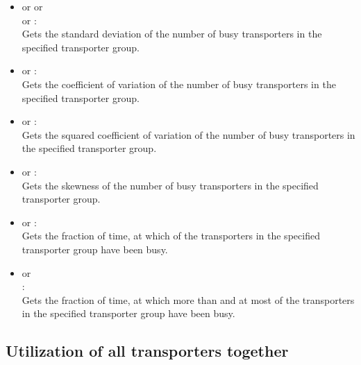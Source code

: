 \begin{itemize}
\item
{} or  or\\
 or :\\
Gets the standard deviation of the number of busy transporters in the specified transporter group.
  
\item
{} or :\\
Gets the coefficient of variation of the number of busy transporters in the specified transporter group.
  
\item
{} or :\\
Gets the squared coefficient of variation of the number of busy transporters in the specified transporter group.

\item
{} or :\\
Gets the skewness of the number of busy transporters in the specified transporter group.

\item
{} or :\\
Gets the fraction of time, at which  of the transporters in the specified transporter group have been busy.
  
\item
{} or\\
:\\
Gets the fraction of time, at which more than  and at most  of the transporters in the specified transporter group have been busy.

\end{itemize}



\subsection{Utilization of all transporters together}

